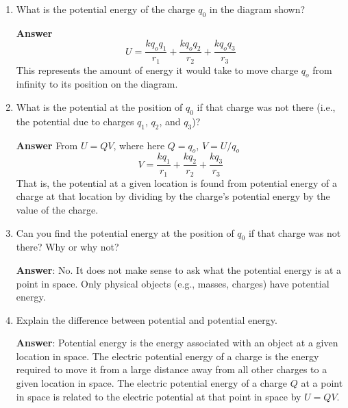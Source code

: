\documentclass{article}
\begin{document}
\begin{enumerate}

  \item What is the potential energy of the charge $q_0$ in the diagram shown?

        \ifsolutions
        \textbf{Answer}
        \begin{equation}
        U = \frac{kq_oq_1}{r_1}+\frac{kq_oq_2}{r_2}+\frac{kq_oq_3}{r_3}
        \end{equation}
        This represents the amount of energy it would take to move charge $q_o$ from infinity to its position on the 
        diagram.
        \else
        \vskip 48pt
        \fi

  \item What is the potential at the position of $q_0$ if that charge was not there (i.e., the potential due to charges $q_1$, $q_2$, and $q_3$)?

        \ifsolutions
        \textbf{Answer} From $U=QV$, where here $Q=q_o$, $V=U/q_o$ 
        \begin{equation}
        V = \frac{kq_1}{r_1}+\frac{kq_2}{r_2}+\frac{kq_3}{r_3}
        \end{equation}
        That is, the potential at a given location is found from potential energy of a charge at that location by dividing by the charge's potential energy by the value of the charge.
        \else
        \vskip 48pt
        \fi

  \item Can you find the potential energy at the position of $q_0$ if that charge was not there? Why or why not?

        \ifsolutions
        \textbf{Answer}: No. It does not make sense to ask what the potential energy is at a point in space. Only physical objects (e.g., masses, charges) have potential energy.
        \else
        \vskip 48pt
        \fi

  \item Explain the difference between potential and potential energy.

        \ifsolutions
        \textbf{Answer}: Potential energy is the energy associated with an object at a given location in space. The electric potential energy of a charge is the energy required to move it from a large distance away from all other charges to a given location in space. The electric potential energy of a charge $Q$ at a point in space is related to the electric potential at that point in space by $U=QV$.
        \else
        \vskip 48pt
        \fi

\end{enumerate}
\end{document}
